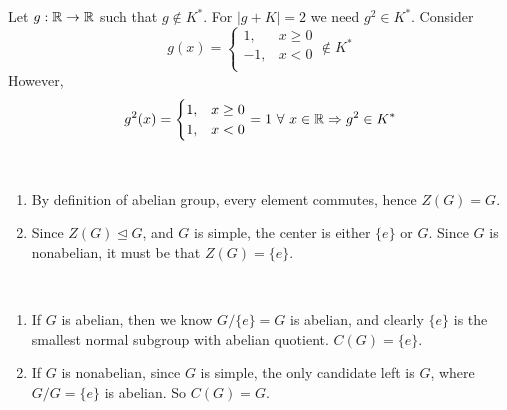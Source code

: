\documentclass[12pt]{article}
\begin{document}
\begin{problem}[15.23]
	Let $ g: \mathbb{R} \to \mathbb{R}$ such that $ g \not\in K^* $. For $ |g+K|=2$ we need  $ g^2 \in K^* $. Consider
	 \begin{equation*}
		 g(x)=
	\begin{cases}
		1, & x \geq 0\\
		-1, & x<0\\
	\end{cases}
	\not\in K^* 
	\end{equation*}
However,
\begin{equation*}
	g^2(x)=
\begin{cases}
	1, & x\geq 0\\
	1, & x<0
\end{cases}
=1 \ \forall \ x \in \mathbb{R} \Rightarrow  g^2 \in K^* 
\end{equation*}
\end{problem}
\begin{problem}[15.30]
~\begin{enumerate}[label=\alph*)]
	\item By definition of abelian group, every element commutes, hence $ Z(G)=G$.
	\item Since  $ Z(G) \trianglelefteq G$, and $ G$ is simple, the center is either  $ \{e\} $ or $ G$. Since  $ G$ is nonabelian, it must be that  $ Z(G)=\{e\} $.
\end{enumerate}
\end{problem}
\begin{problem}[15.31]
~\begin{enumerate}[label=\alph*)]
	\item If $ G$ is abelian, then we know  $ G /\{e\} = G $ is abelian, and clearly $ \{e\} $ is the smallest normal subgroup with abelian quotient. $ C(G)=\{e\} $.
	\item If $ G$ is nonabelian, since  $ G$ is simple, the only candidate left is  $ G$, where $ G /G = \{e\} $ is abelian. So  $C(G)=G $.
\end{enumerate}
\end{problem}
\end{document}
